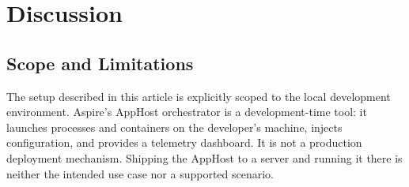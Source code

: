 \section{Discussion}
\label{sec:discussion}

\subsection{Scope and Limitations}

The setup described in this article is explicitly scoped to the local development environment. Aspire's AppHost orchestrator is a development-time tool: it launches processes and containers on the developer's machine, injects configuration, and provides a telemetry dashboard. It is not a production deployment mechanism. Shipping the AppHost to a server and running it there is neither the intended use case nor a supported scenario.

